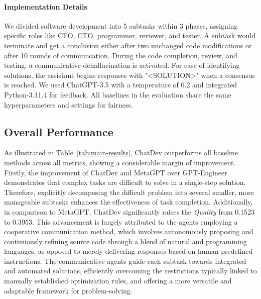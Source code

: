 \documentclass[11pt]{article}
\begin{document}
\noindent \paragraph{Implementation Details} We divided software development into 5 subtasks within 3 phases, assigning specific roles like CEO, CTO, programmer, reviewer, and tester. A subtask would terminate and get a conclusion either after two unchanged code modifications or after 10 rounds of communication. During the code completion, review, and testing, a communicative dehallucination is activated. For ease of identifying solutions, the assistant begins responses with "<SOLUTION>" when a consensus is reached. We used ChatGPT-3.5 with a temperature of 0.2 and integrated Python-3.11.4 for feedback. All baselines in the evaluation share the same hyperparameters and settings for fairness.


\subsection{Overall Performance}
As illustrated in Table~\ref{tab:main-results}, ChatDev outperforms all baseline methods across all metrics, showing a considerable margin of improvement.
Firstly, the improvement of ChatDev and MetaGPT over GPT-Engineer demonstrates that complex tasks are difficult to solve in a single-step solution. Therefore, explicitly decomposing the difficult problem into several smaller, more manageable subtasks enhances the effectiveness of task completion.
Additionally, in comparison to MetaGPT, ChatDev significantly raises the \textit{Quality} from 0.1523 to 0.3953. This advancement is largely attributed to the agents employing a cooperative communication method, which involves autonomously proposing and continuously refining source code through a blend of natural and programming languages, as opposed to merely delivering responses based on human-predefined instructions.
The communicative agents guide each subtask towards integrated and automated solutions, efficiently overcoming the restrictions typically linked to manually established optimization rules, and offering a more versatile and adaptable framework for problem-solving.

\begin{table}[t]
\centering
{}
\caption{Software statistics include Duration (time consumed), \#Tokens (number of tokens used), \#Files (number of code files generated), and \#Lines (total lines of code across all files) in the software generation process.}
\label{tab:statistics}
\end{table}
\end{document}
